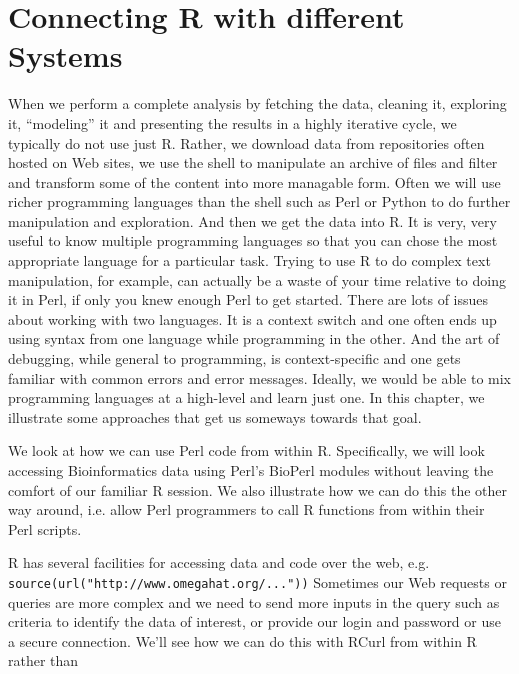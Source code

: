
\section{Connecting R with different Systems}

When we perform a complete analysis by fetching the data, cleaning it,
exploring it, ``modeling'' it and presenting the results in a highly
iterative cycle, we typically do not use just R.  Rather, we download
data from repositories often hosted on Web sites, we use the shell to
manipulate an archive of files and filter and transform some of the
content into more managable form. Often we will use richer programming
languages than the shell such as Perl or Python to do further
manipulation and exploration.  And then we get the data into R.  It is
very, very useful to know multiple programming languages so that you
can chose the most appropriate language for a particular task. Trying
to use R to do complex text manipulation, for example, can actually be
a waste of your time relative to doing it in Perl, if only you knew
enough Perl to get started. There are lots of issues about working
with two languages.  It is a context switch and one often ends up
using syntax from one language while programming in the other. And the
art of debugging, while general to programming, is context-specific
and one gets familiar with common errors and error messages.  Ideally,
we would be able to mix programming languages at a high-level and
learn just one.  In this chapter, we illustrate some approaches that
get us someways towards that goal.

We look at how we can use Perl code from within R. Specifically, we
will look accessing Bioinformatics data using Perl's BioPerl modules
without leaving the comfort of our familiar R session.  We also
illustrate how we can do this the other way around, i.e.  allow Perl
programmers to call R functions from within their Perl scripts.

R has several facilities for accessing data and code over the web,
e.g. \verb+source(url("http://www.omegahat.org/..."))+
Sometimes our Web requests or queries are more complex and we need to
send more inputs in the query such as criteria to identify the data of
interest, or provide our login and password or use a secure
connection. We'll see how we can do this with RCurl from within R
rather than 




